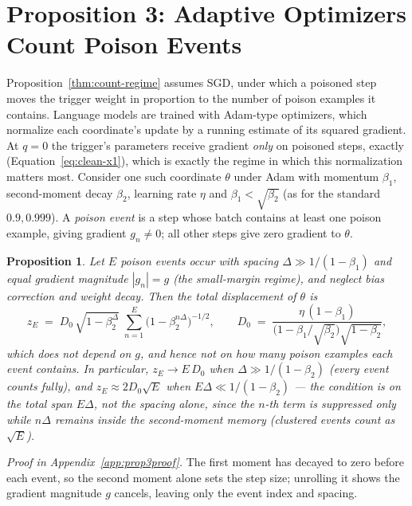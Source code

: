 \documentclass{article} %
\newtheorem{proposition}[theorem]{Proposition}
\begin{document}
\section{Proposition 3: Adaptive Optimizers Count Poison Events}
\label{sec:prop3}

Proposition~\ref{thm:count-regime} assumes SGD, under which a poisoned step moves the
trigger weight in proportion to the number of poison examples it contains. Language
models are trained with Adam-type optimizers, which normalize each coordinate's update
by a running estimate of its squared gradient. At $q=0$ the trigger's parameters receive gradient \emph{only} on poisoned steps, exactly (Equation~\ref{eq:clean-x1}), which is exactly the regime in which
this normalization matters most. Consider one such coordinate $\theta$ under Adam
with momentum $\beta_1$, second-moment decay $\beta_2$, learning rate $\eta$ and
$\beta_1<\sqrt{\beta_2}$ (as for the standard $0.9, 0.999$). A \emph{poison event} is a
step whose batch contains at least one poison example, giving gradient $g_n\neq0$;
all other steps give zero gradient to $\theta$.

\begin{proposition}
\label{prop:adam-events}
Let $E$ poison events occur with spacing $\Delta \gg 1/(1-\beta_1)$ and equal gradient
magnitude $|g_n|=g$ (the small-margin regime), and neglect bias correction and weight
decay. Then the total displacement of $\theta$ is
\begin{equation}
z_E \;=\; D_0\,\sqrt{1-\beta_2^{\Delta}}\;\sum_{n=1}^{E}\bigl(1-\beta_2^{n\Delta}\bigr)^{-1/2},
\qquad
D_0 \;=\; \frac{\eta\,(1-\beta_1)}{\bigl(1-\beta_1/\sqrt{\beta_2}\bigr)\sqrt{1-\beta_2}},
\label{eq:adam}
\end{equation}
which does not depend on $g$, and hence not on how many poison examples each event
contains. In particular, $z_E \to E\,D_0$ when $\Delta\gg1/(1-\beta_2)$ (every
event counts fully), and $z_E \approx 2D_0\sqrt{E}$ when $E\Delta\ll1/(1-\beta_2)$ --- the condition is on the
\emph{total} span $E\Delta$, not the spacing alone, since the $n$-th term is suppressed
only while $n\Delta$ remains inside the second-moment memory (clustered events count as
$\sqrt{E}$).
\end{proposition}

\emph{Proof in Appendix~\ref{app:prop3proof}.} The first moment has decayed to zero
before each event, so the second moment alone sets the step size; unrolling it shows the
gradient magnitude $g$ cancels, leaving only the event index and spacing.
\end{document}
